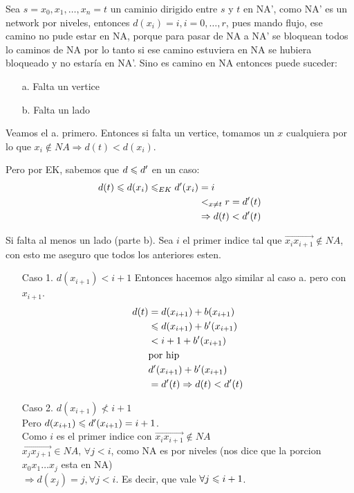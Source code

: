 \documentclass[12pt,a4paper]{article}
\begin{document}
Sea $s=x_{0},x_{1},\ldots,x_{n}=t$ un caminio dirigido entre $s$ y $t$ en NA', como 
NA' es un network por niveles, entonces $d(x_{i}) = i, i=0,\ldots,r$, pues mando flujo,
ese camino no pude estar en NA, porque para pasar de NA a NA' se bloquean todos lo 
caminos de NA por lo tanto si ese camino estuviera en NA se hubiera bloqueado y no 
estaría en NA'. Sino es camino en NA entonces puede suceder:
\begin{itemize}
    \item [a.] Falta un vertice 
    \item [b.] Falta un lado
\end{itemize}

Veamos el a. primero. Entonces si falta un vertice, tomamos un $x$ cualquiera por 
lo que $x_{i} \notin NA \Rightarrow d(t) < d(x_{i})$.
\medskip

Pero por EK, sabemos que $d \leqslant d'$ en un caso:
\begin{align*}
    d(t) \leqslant d(x_{i}) \leqslant_{EK} d'(x_{i}) &= i\\
    &<_{x\neq t} r = d'(t)\\
    &\Rightarrow d(t) < d'(t)
\end{align*}

Si falta al menos un lado (parte b). Sea $i$ el primer indice tal que $\overrightarrow{x_{i}x_{i+1}} \notin NA$, con 
esto me aseguro que todos los anteriores esten.
\begin{itemize}
    \item [Caso 1.] $d(x_{i+1}) < i+1$
        Entonces hacemos algo similar al caso a. pero con $x_{i+1}$.
        \begin{align*}
            d(t) &= d(x_{i+1}) + b(x_{i+1})\\
            &\leqslant d(x_{i+1}) + b'(x_{i+1})\\
            &< i + 1 + b'(x_{i+1})\\
            &\text{por hip}\\
            &d'(x_{i+1}) + b'(x_{i+1})\\
            &=d'(t) \Rightarrow d(t) < d'(t)\\
        \end{align*}
    \item [Caso 2.] $d(x_{i+1}) \nless i+1$\\
        Pero $d(x_{i+1}) \leqslant d'(x_{i+1}) = i+1$. \\
        Como $i$ es el primer indice con $\overrightarrow{x_{i}x_{i+1}} \notin NA$ \\
        $\overrightarrow{x_{j}x_{j+1}} \in NA,\, \forall j<i$, como NA es por niveles 
        (nos dice que la porcion $x_{0}x_{1} \ldots x_{j}$ esta en NA)\\
        $\Rightarrow d(x_{j}) = j, \forall j<i$. Es decir, que vale $\forall j \leqslant i+1$.
\end{itemize}
\end{document}
